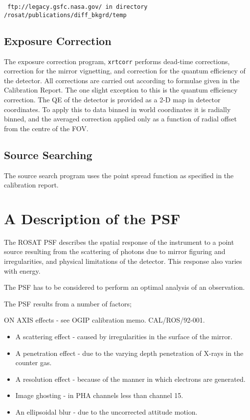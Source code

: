 \documentclass[11pt,fleqn]{article}    %
\begin{document}
\begin{verbatim}
 ftp://legacy.gsfc.nasa.gov/ in directory /rosat/publications/diff_bkgrd/temp
\end{verbatim}

\subsection{Exposure Correction} 
The exposure correction program, {\tt xrtcorr} performs dead-time corrections,
correction for the mirror vignetting, and correction for the quantum
efficiency of the detector.  All corrections are carried out according
to formulae given in the Calibration Report.  The one slight exception to
this is the quantum efficiency correction. The QE of the detector is 
provided as a 2-D map in detector coordinates.  To apply this to data
binned in world coordinates it is radially binned, and the averaged
correction applied only as a function of radial offset from the centre of
the FOV.
\subsection{Source Searching}
The source search program uses the point spread function as specified
in the calibration report.

\newpage
\section{A Description of the PSF}
 
The ROSAT PSF describes the  spatial response of  the instrument to a point
source resulting from the scattering of photons due  to mirror figuring and
irregularities, and physical limitations of the detector. This response also
varies with energy.

The PSF  has  to  be considered   to  perform an  optimal   analysis of  an
observation. 

The PSF results from a number of factors;

ON AXIS effects - see OGIP calibration memo. CAL/ROS/92-001.
\begin{itemize}
\item A scattering effect  - caused by irregularities in the surface of the mirror.
\item A penetration effect - due to the varying depth penetration of X-rays in the counter gas.
\item A resolution effect  - because of the  manner in which electrons are generated.
\item Image ghosting    - in PHA channels less than channel 15. 
\item An ellipsoidal blur    - due to the uncorrected attitude motion.
\end{itemize}
\end{document}
